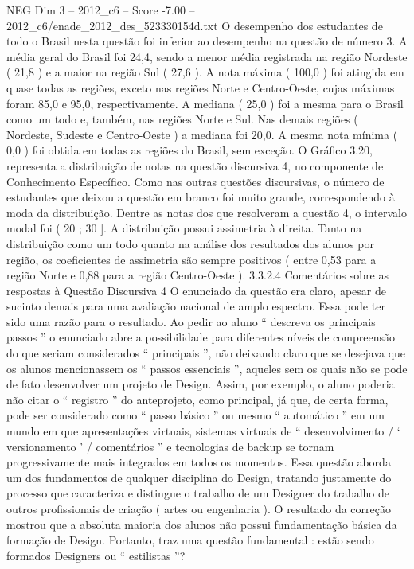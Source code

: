 \begin{textsample}{NEG Dim 3 – 2012\_c6 – Score -7.00 – 2012\_c6/enade\_2012\_des\_523330154d.txt}
O desempenho dos estudantes de todo o Brasil nesta questão foi inferior ao desempenho na questão de número 3.
A média geral do Brasil foi 24,4, sendo a menor média registrada na região Nordeste ( 21,8 ) e a maior na região Sul ( 27,6 ).
A nota máxima ( 100,0 ) foi atingida em quase todas as regiões, exceto nas regiões Norte e Centro-Oeste, cujas máximas foram 85,0 e 95,0, respectivamente.
A mediana ( 25,0 ) foi a mesma para o Brasil como um todo e, também, nas regiões Norte e Sul.
Nas demais regiões ( Nordeste, Sudeste e Centro-Oeste ) a mediana foi 20,0.
A mesma nota mínima ( 0,0 ) foi obtida em todas as regiões do Brasil, sem exceção.
O Gráfico 3.20, representa a distribuição de notas na questão discursiva 4, no componente de Conhecimento Específico.
Como nas outras questões discursivas, o número de estudantes que deixou a questão em branco foi muito grande, correspondendo à moda da distribuição.
Dentre as notas dos que resolveram a questão 4, o intervalo modal foi ( 20 ; 30 ].
A distribuição possui assimetria à direita.
Tanto na distribuição como um todo quanto na análise dos resultados dos alunos por região, os coeficientes de assimetria são sempre positivos ( entre 0,53 para a região Norte e 0,88 para a região Centro-Oeste ). 3.3.2.4 Comentários sobre as respostas à Questão Discursiva 4 O enunciado da questão era claro, apesar de sucinto demais para uma avaliação nacional de amplo espectro.
Essa pode ter sido uma razão para o resultado.
Ao pedir ao aluno “ descreva os principais passos ” o enunciado abre a possibilidade para diferentes níveis de compreensão do que seriam considerados “ principais ”, não deixando claro que se desejava que os alunos mencionassem os “ passos essenciais ”, aqueles sem os quais não se pode de fato desenvolver um projeto de Design.
Assim, por exemplo, o aluno poderia não citar o “ registro ” do anteprojeto, como principal, já que, de certa forma, pode ser considerado como “ passo básico ” ou mesmo “ automático ” em um mundo em que apresentações virtuais, sistemas virtuais de “ desenvolvimento / ‘ versionamento ’ / comentários ” e tecnologias de backup se tornam progressivamente mais integrados em todos os momentos.
Essa questão aborda um dos fundamentos de qualquer disciplina do Design, tratando justamente do processo que caracteriza e distingue o trabalho de um Designer do trabalho de outros profissionais de criação ( artes ou engenharia ).
O resultado da correção mostrou que a absoluta maioria dos alunos não possui fundamentação básica da formação de Design.
Portanto, traz uma questão fundamental : estão sendo formados Designers ou “ estilistas ”?

\end{textsample}
